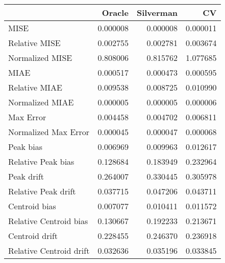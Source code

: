 \begin{tabular}{lrrr}
  \hline
 & Oracle & Silverman & CV \\ 
  \hline
MISE & 0.000008 & 0.000008 & 0.000011 \\ 
  Relative MISE & 0.002755 & 0.002781 & 0.003674 \\ 
  Normalized MISE & 0.808006 & 0.815762 & 1.077685 \\ 
  MIAE & 0.000517 & 0.000473 & 0.000595 \\ 
  Relative MIAE & 0.009538 & 0.008725 & 0.010990 \\ 
  Normalized MIAE & 0.000005 & 0.000005 & 0.000006 \\ 
  Max Error & 0.004458 & 0.004702 & 0.006811 \\ 
  Normalized Max Error & 0.000045 & 0.000047 & 0.000068 \\ 
  Peak bias & 0.006969 & 0.009963 & 0.012617 \\ 
  Relative Peak bias & 0.128684 & 0.183949 & 0.232964 \\ 
  Peak drift & 0.264007 & 0.330445 & 0.305978 \\ 
  Relative Peak drift & 0.037715 & 0.047206 & 0.043711 \\ 
  Centroid bias & 0.007077 & 0.010411 & 0.011572 \\ 
  Relative Centroid bias & 0.130667 & 0.192233 & 0.213671 \\ 
  Centroid drift & 0.228455 & 0.246370 & 0.236918 \\ 
  Relative Centroid drift & 0.032636 & 0.035196 & 0.033845 \\ 
   \hline
\end{tabular}
